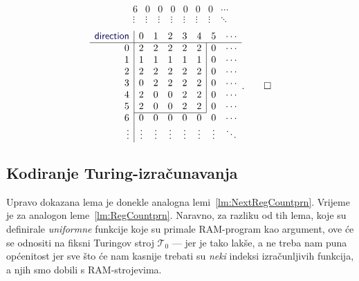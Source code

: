 \begin{primjer}
\begin{equation}
\begin{array}{r|ccccccc}
6& 0 & 0 & 0 & 0 & 0 & 0 & \cdots\\
\vdots&\vdots&\vdots&\vdots&\vdots&\vdots&\vdots&\ddots
\end{array}
\end{equation}
\begin{equation}
\begin{array}{r|ccccccc}
\f{direction}&0&1&2&3&4&5&\cdots\\\hline
0& 2 & 2 & 2 & 2 & 2 & \multicolumn{1}{|c}{0} & \cdots\\
1& 1 & 1 & 1 & 1 & 1 & \multicolumn{1}{|c}{0} & \cdots\\
2& 2 & 2 & 2 & 2 & 2 & \multicolumn{1}{|c}{0} & \cdots\\
3& 0 & 2 & 2 & 2 & 2 & \multicolumn{1}{|c}{0} & \cdots\\
4& 2 & 0 & 0 & 2 & 2 & \multicolumn{1}{|c}{0} & \cdots\\
5& 2 & 0 & 0 & 2 & 2 & \multicolumn{1}{|c}{0} & \cdots\\ \cline{2-6}
6& 0 & 0 & 0 & 0 & 0 & 0 & \cdots\\
\vdots&\vdots&\vdots&\vdots&\vdots&\vdots&\vdots&\ddots
\end{array}\text.\qedhere
\end{equation}
\end{primjer}

\subsection{Kodiranje Turing-izračunavanja}

Upravo dokazana lema je donekle analogna lemi~\ref{lm:NextRegCountprn}. Vrijeme je za analogon leme~\ref{lm:RegCountprn}. Naravno, za razliku od tih lema, koje su definirale \emph{uniformne} funkcije koje su primale RAM-program kao argument, ove će se odnositi na fiksni Turingov stroj $\mathcal T_0$ --- jer je tako lakše, a ne treba nam puna općenitost jer sve što će nam kasnije trebati su \emph{neki} indeksi izračunljivih funkcija, a njih smo dobili s RAM-strojevima.

